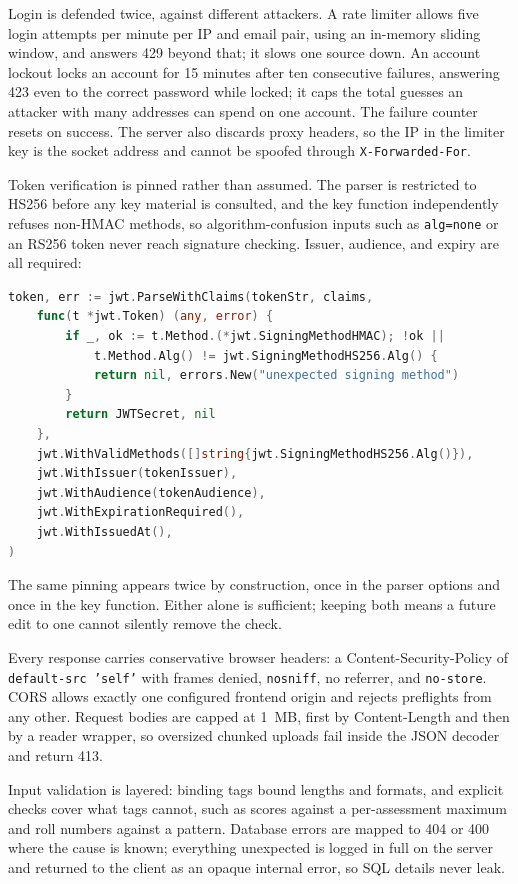 \documentclass[11pt,a4paper]{article}
\begin{document}
Login is defended twice, against different attackers. A rate limiter allows five login attempts per minute per IP and email pair, using an in-memory sliding window, and answers 429 beyond that; it slows one source down. An account lockout locks an account for 15 minutes after ten consecutive failures, answering 423 even to the correct password while locked; it caps the total guesses an attacker with many addresses can spend on one account. The failure counter resets on success. The server also discards proxy headers, so the IP in the limiter key is the socket address and cannot be spoofed through \texttt{X-Forwarded-For}.

Token verification is pinned rather than assumed. The parser is restricted to HS256 before any key material is consulted, and the key function independently refuses non-HMAC methods, so algorithm-confusion inputs such as \texttt{alg=none} or an RS256 token never reach signature checking. Issuer, audience, and expiry are all required:

\begin{lstlisting}[language=Go]
token, err := jwt.ParseWithClaims(tokenStr, claims,
    func(t *jwt.Token) (any, error) {
        if _, ok := t.Method.(*jwt.SigningMethodHMAC); !ok ||
            t.Method.Alg() != jwt.SigningMethodHS256.Alg() {
            return nil, errors.New("unexpected signing method")
        }
        return JWTSecret, nil
    },
    jwt.WithValidMethods([]string{jwt.SigningMethodHS256.Alg()}),
    jwt.WithIssuer(tokenIssuer),
    jwt.WithAudience(tokenAudience),
    jwt.WithExpirationRequired(),
    jwt.WithIssuedAt(),
)
\end{lstlisting}

The same pinning appears twice by construction, once in the parser options and once in the key function. Either alone is sufficient; keeping both means a future edit to one cannot silently remove the check.

Every response carries conservative browser headers: a Content-Security-Policy of \texttt{default-src 'self'} with frames denied, \texttt{nosniff}, no referrer, and \texttt{no-store}. CORS allows exactly one configured frontend origin and rejects preflights from any other. Request bodies are capped at 1~MB, first by Content-Length and then by a reader wrapper, so oversized chunked uploads fail inside the JSON decoder and return 413.

Input validation is layered: binding tags bound lengths and formats, and explicit checks cover what tags cannot, such as scores against a per-assessment maximum and roll numbers against a pattern. Database errors are mapped to 404 or 400 where the cause is known; everything unexpected is logged in full on the server and returned to the client as an opaque internal error, so SQL details never leak.
\end{document}
